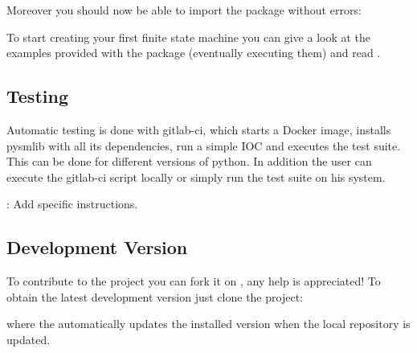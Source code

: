 \documentclass[letterpaper,10pt,english]{sphinxmanual}
\begin{document}
Moreover you should now be able to import the  package without errors:

%
\begin{sphinxVerbatim}[commandchars=\\\{\}]
 
\end{sphinxVerbatim}

To start creating your first finite state machine you can give a look at the
examples provided with the package (eventually executing them) and read
{\hyperref[\detokenize{overview:pysmlib-overview}]{}}.


\subsection{Testing}
\label{\detokenize{installation:testing}}

Automatic testing is done with gitlab-ci, which starts a Docker image, installs
pysmlib with all its dependencies, run a simple IOC and executes the test suite.
This can be done for different versions of python. In addition the user can
execute the gitlab-ci script locally or simply run the test suite on his system.

: Add specific instructions.


\subsection{Development Version}
\label{\detokenize{installation:development-version}}
To contribute to the project you can fork it on , any help is appreciated!
To obtain the latest development version just clone the project:

%
\begin{sphinxVerbatim}[commandchars=\\\{\}]
  
 
   
\end{sphinxVerbatim}

where the  automatically updates the installed version when the local
repository is updated.
\end{document}
